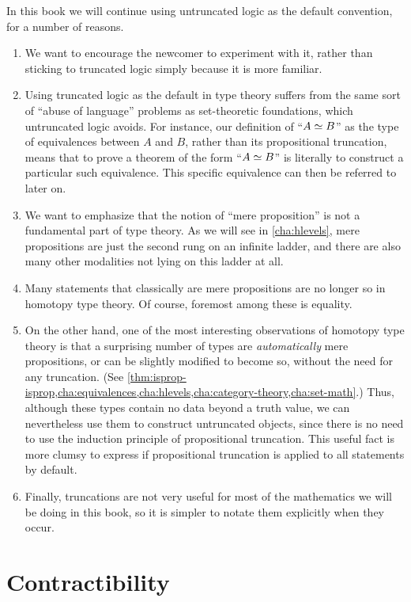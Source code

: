 In this book we will continue using untruncated logic as the default convention, for a number of reasons.
\begin{enumerate}[label=(\arabic*)]
\item We want to encourage the newcomer to experiment with it, rather than sticking to truncated logic simply because it is more familiar.
\item Using truncated logic as the default in type theory suffers from the same sort of ``abuse of language'' problems as set-theoretic foundations, which untruncated logic avoids.
  For instance, our definition of ``$A \simeq B$'' as the type of equivalences between $A$ and $B$, rather than its propositional truncation, means that to prove a theorem of the form ``$A \simeq B$'' is literally to construct a particular such equivalence.
  This specific equivalence can then be referred to later on.
\item We want to emphasize that the notion of ``mere proposition'' is not a fundamental part of type theory.
  As we will see in \autoref{cha:hlevels}, mere propositions are just the second rung on an infinite ladder, and there are also many other modalities not lying on this ladder at all.
\item Many statements that classically are mere propositions are no longer so in homotopy type theory.
  Of course, foremost among these is equality.
\item On the other hand, one of the most interesting observations of homotopy type theory is that a surprising number of types are \emph{automatically} mere propositions, or can be slightly modified to become so, without the need for any truncation.
  (See \autoref{thm:isprop-isprop,cha:equivalences,cha:hlevels,cha:category-theory,cha:set-math}.)
  Thus, although these types contain no data beyond a truth value, we can nevertheless use them to construct untruncated objects, since there is no need to use the induction principle of propositional truncation.
  This useful fact is more clumsy to express if propositional truncation is applied to all statements by default.
\item Finally, truncations are not very useful for most of the mathematics we will be doing in this book, so it is simpler to notate them explicitly when they occur.
\end{enumerate}

%
%

\section{Contractibility}
\label{sec:contractibility}

